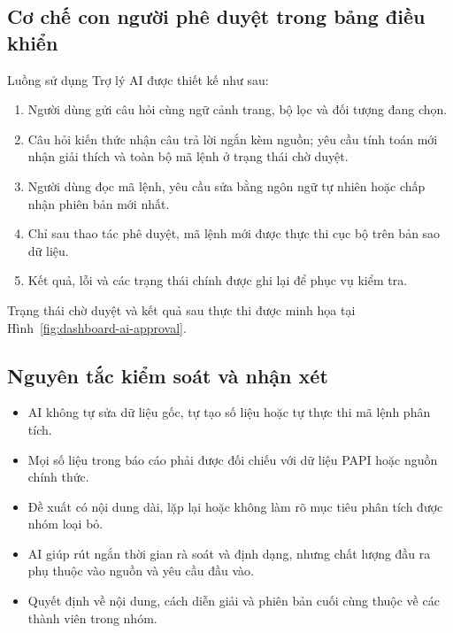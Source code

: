 \subsection{Cơ chế con người phê duyệt trong bảng điều khiển}

Luồng sử dụng Trợ lý AI được thiết kế như sau:

\begin{enumerate}
    \setlength{\itemsep}{0.2em}
    \setlength{\parskip}{0pt}
    \item Người dùng gửi câu hỏi cùng ngữ cảnh trang, bộ lọc và đối tượng đang chọn.
    \item Câu hỏi kiến thức nhận câu trả lời ngắn kèm nguồn; yêu cầu tính toán mới nhận giải thích và toàn bộ mã lệnh ở trạng thái chờ duyệt.
    \item Người dùng đọc mã lệnh, yêu cầu sửa bằng ngôn ngữ tự nhiên hoặc chấp nhận phiên bản mới nhất.
    \item Chỉ sau thao tác phê duyệt, mã lệnh mới được thực thi cục bộ trên bản sao dữ liệu.
    \item Kết quả, lỗi và các trạng thái chính được ghi lại để phục vụ kiểm tra.
\end{enumerate}

Trạng thái chờ duyệt và kết quả sau thực thi được minh họa tại Hình~\ref{fig:dashboard-ai-approval}.

\subsection{Nguyên tắc kiểm soát và nhận xét}

\begin{itemize}
    \setlength{\itemsep}{0.2em}
    \setlength{\parskip}{0pt}
    \item AI không tự sửa dữ liệu gốc, tự tạo số liệu hoặc tự thực thi mã lệnh phân tích.
    \item Mọi số liệu trong báo cáo phải được đối chiếu với dữ liệu PAPI hoặc nguồn chính thức.
    \item Đề xuất có nội dung dài, lặp lại hoặc không làm rõ mục tiêu phân tích được nhóm loại bỏ.
    \item AI giúp rút ngắn thời gian rà soát và định dạng, nhưng chất lượng đầu ra phụ thuộc vào nguồn và yêu cầu đầu vào.
    \item Quyết định về nội dung, cách diễn giải và phiên bản cuối cùng thuộc về các thành viên trong nhóm.
\end{itemize}
